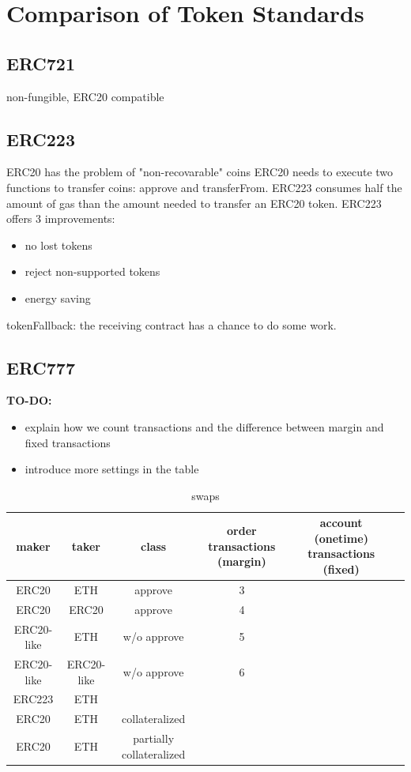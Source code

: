 \section{Comparison of Token Standards}
\subsection{ERC721}
non-fungible, ERC20 compatible
\subsection{ERC223}
ERC20 has the problem of "non-recovarable" coins
ERC20 needs to execute two functions to transfer coins: approve and transferFrom. ERC223 consumes half the amount of gas than the amount needed to transfer an ERC20 token.
ERC223 offers 3 improvements:
\begin{itemize}
  \item no lost tokens
  \item reject non-supported tokens
  \item energy saving
\end{itemize}

tokenFallback: the receiving contract has a chance to do some work.
\subsection{ERC777}


\textbf{TO-DO:}
\begin{itemize}
  \item explain how we count transactions and the difference between margin and fixed transactions
  \item introduce more settings in the table
\end{itemize}

\begin{table}[h!]
\footnotesize
\centering
\begin{tabular}{ |c|c|c|c|c|c| }
  \hline
   maker & taker & class & order transactions (margin) & account (onetime) transactions (fixed) \\ \hline
   ERC20 & ETH & approve & 3 & \\ \hline
   ERC20 & ERC20 & approve & 4 & \\ \hline
   ERC20-like & ETH & w/o approve & 5 & \\ \hline
   ERC20-like & ERC20-like & w/o approve & 6 & \\ \hline
   ERC223 & ETH & & &\\ \hline
   ERC20 & ETH & collateralized & &\\ \hline
   ERC20 & ETH & partially collateralized & &\\ \hline
\end{tabular}
\caption {swaps}
\end{table}\label{Table:Comparison of different swaps} 